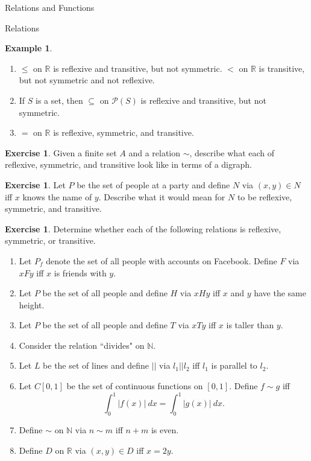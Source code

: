 \documentclass[11pt]{article}
\theoremstyle{definition}
\newtheorem{example}[theorem]{Example}
\newtheorem{exercise}[theorem]{Exercise}
\begin{document}
\begin{section}{Relations and Functions}
\begin{subsection}{Relations}
\begin{example}\
\begin{enumerate}
\item $\leq$ on $\mathbb{R}$ is reflexive and transitive, but not symmetric.
$<$ on $\mathbb{R}$ is transitive, but not symmetric and not reflexive.
\item If $S$ is a set, then $\subseteq$ on $\mathcal{P}(S)$ is reflexive and transitive, but not symmetric.
\item $=$ on $\mathbb{R}$ is reflexive, symmetric, and transitive.
\end{enumerate}

\end{example}

\begin{exercise}
Given a finite set $A$ and a relation $\sim$, describe what each of reflexive, symmetric, and transitive look like in terms of a digraph.
\end{exercise}

\begin{exercise}
Let $P$ be the set of people at a party and define $N$ via $(x,y)\in N$ iff $x$ knows the name of $y$.  Describe what it would mean for $N$ to be reflexive, symmetric, and transitive.
\end{exercise}

\begin{exercise}
Determine whether each of the following relations is reflexive, symmetric, or transitive.

\begin{enumerate}
\item Let $P_f$ denote the set of all people with accounts on Facebook.  Define  $F$ via $xFy$ iff $x$ is friends with $y$. 
\item Let $P$ be the set of all people and define $H$ via $xHy$ iff $x$ and $y$ have the same height.
\item Let $P$ be the set of all people and define $T$ via $xTy$ iff $x$ is taller than $y$.
\item Consider the relation ``divides" on $\mathbb{N}$.
\item Let $L$ be the set of lines and define $||$ via $l_1||l_2$ iff $l_1$ is parallel to $l_2$.
\item Let $C[0,1]$ be the set of continuous functions on $[0,1]$.  Define $f\sim g$ iff
\[
\int_0^1|f(x)|\ dx=\int_0^1|g(x)|\ dx.
\]
\item Define $\sim$ on $\mathbb{N}$ via $n\sim m$ iff $n+m$ is even.
\item Define $D$ on $\mathbb{R}$ via $(x,y)\in D$ iff $x=2y$.
\end{enumerate}
\end{exercise}

\end{subsection}

\end{section}
\end{document}
